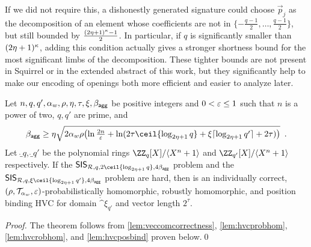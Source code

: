 \begin{remark}
\begin{enumerate}
{If we did not require this, a dishonestly generated signature could choose $\vec{p}_j$ as the decomposition of an element whose coefficients are not in $\{-\tfrac{q-1}{2},\ldots,\tfrac{q-1}{2}\}$, but still bounded by $\frac{(2\eta+1)^\kappa-1}{2}$.
In particular, if $q$ is significantly smaller than $(2\eta+1)^\kappa$, adding this condition actually gives a stronger shortness bound for the most significant limbs of the decomposition.
These tighter bounds are not present in Squirrel or in the extended abstract of this work, but they significantly help to make our encoding of openings both more efficient and easier to analyze later.%
}
\end{enumerate}
\end{remark}

\begin{theorem}\label{theo:veccom}
  Let $n,q,q',\alpha_w,\rho,\eta,\tau,\xi,\beta_{\mathsf{agg}}$ be positive integers and $0 < \varepsilon \leq 1$ such that $n$ is a power of two, $q,q'$ are prime, and 
\[
\bagg \geq \eta\sqrt{2\alpha_w\rho
  \bigl(
  \ln\tfrac{2n}{\errorbound} +  \ln(2\tau \ceil{\log_{2\eta+1}q} + \xi\lceil\log_{2\eta+1}q'\rceil \eprint{+ 2\tau})
  \bigr)}\enspace.
\]
  Let $\ring_q,\ring_{q'}$ be the polynomial rings $\defringq$ and $\defringqq$ respectively.
  If the $\sis_{\ring,q,2\ceil{\log_{2\eta+1} q},4\bagg}$ problem and the $\sis_{\ring,q,\xi\ceil{\log_{2\eta+1} q'} ,4\bagg}$ problem are hard,
  then \eprint{$\hvcplain$}\cameraready{$\hvccamera$} is an individually correct, $(\rho,\mathcal{T}_{\alpha_w},\varepsilon)$-probabilistically homomorphic, robustly homomorphic, and position binding HVC for domain $\ring^{\xi}_{q'}$ and vector length $2^\tau$.
\end{theorem}
\begin{proof}
  The theorem follows from \autoref{lem:veccomcorrectness}, \autoref{lem:hvcprobhom}, \autoref{lem:hvcrobhom}, and \autoref{lem:hvcposbind} proven below.\qed
\end{proof}

